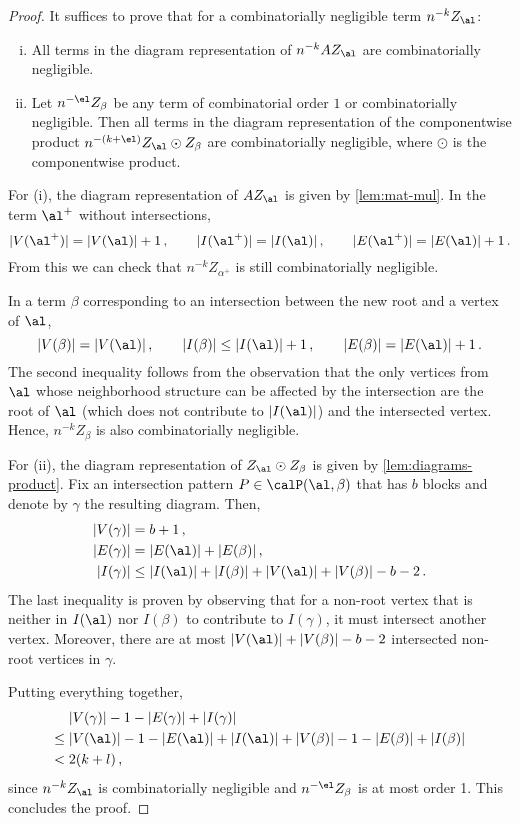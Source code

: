 \documentclass[12pt]{article}
\begin{document}
\eqinfProperties*
\begin{proof} 
    It suffices to prove that for a combinatorially negligible term $n^{-k} Z_\al$:
    \begin{enumerate}[(i)]
        \item All terms in the diagram representation of $n^{-k} AZ_\al$ are combinatorially negligible.
        \item Let $n^{-\el} Z_\beta$ be any term of combinatorial order $1$ or combinatorially negligible.
        Then all terms in the diagram representation of the componentwise product $n^{-(k+\el)} Z_\al \odot Z_\beta$ are combinatorially negligible,
        where $\odot$ is the componentwise product.
    \end{enumerate}

    For (i), the diagram representation of $A Z_\al$ is given by \cref{lem:mat-mul}. In the term $\al^+$ without intersections,
    \[
        |V(\al^+)| = |V(\al)| + 1\,, \qquad |I(\al^+)| = |I(\al)|\,,  \qquad |E(\al^+)| = |E(\al)| + 1\,.
    \]
    From this we can check that $n^{-k} Z_{\alpha^+}$ is still combinatorially negligible.

    In a term $\beta$ corresponding to an intersection
    between the new root and a vertex of $\al$,
    \[
        |V(\beta)| = |V(\al)|\,, \qquad |I(\beta)| \le |I(\al)| + 1 \,, \qquad |E(\beta)| = |E(\al)| + 1\,.
    \]
   The second inequality follows from the observation that the only vertices from $\al$ whose neighborhood structure can be affected by the intersection are the root of $\al$ (which does not contribute to $|I(\al)|$) and the intersected vertex. Hence, $n^{-k} Z_\beta$ is also combinatorially negligible.

    For (ii), the diagram representation of $Z_\al\odot Z_\beta$ is given by \cref{lem:diagrams-product}. Fix an intersection pattern $P\in\calP(\al,\beta)$ that has $b$ blocks and denote by $\gamma$ the resulting diagram. Then,
    \begin{align*}
        |V(\gamma)| &= b+1 \,,\\
        |E(\gamma)| &= |E(\al)|+|E(\beta)| \,,\\
        |I(\gamma)| &\le |I(\al)|+|I(\beta)| + |V(\al)| + |V(\beta)| - b - 2 \,.
    \end{align*}
    The last inequality is proven by observing that for a non-root vertex that is neither in $I(\al)$ nor $I(\beta)$ to contribute to $I(\gamma)$, it must intersect another vertex. Moreover, there are at most $|V(\al)|+|V(\beta)|-b-2$ intersected non-root vertices in $\gamma$.
    
    Putting everything together,
    \begin{align*}
        &|V(\gamma)| - 1 - |E(\gamma)| + |I(\gamma)|\\
        \leq\;&|V(\al)| - 1 - |E(\al)| + |I(\al)| + |V(\beta)| - 1 - |E(\beta)| + |I(\beta)|\\
        <\;&2(k+l)\,,
    \end{align*}
    since $n^{-k} Z_\al$ is combinatorially negligible and $n^{-\el} Z_\beta$ is at most order 1. This concludes the proof.
\end{proof}
\end{document}
